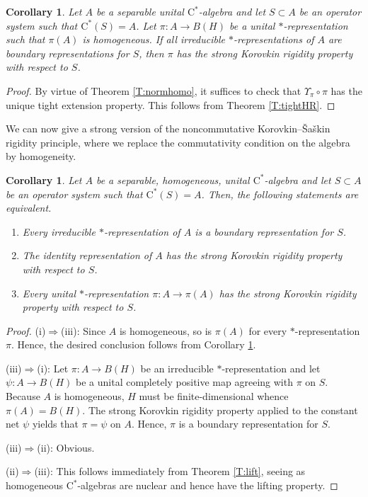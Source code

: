 \documentclass[10pt]{amsart}
\newcommand{\rC}{\mathrm{C}}
\newtheorem{corollary}[lemma]{Corollary}
\theoremstyle{definition}
\begin{document}
\begin{corollary}\label{C:homogrange}
Let $A$ be a separable unital  $\rC^*$-algebra and let $S\subset A$ be an operator system such that $\rC^*(S)=A$. Let $\pi:A\to B(H)$ be a unital $*$-representation such that $\pi(A)$ is homogeneous. If all irreducible $*$-representations of $A$ are boundary representations for $S$, then $\pi$ has the strong Korovkin rigidity property with respect to $S$.
\end{corollary}
\begin{proof}
By virtue of Theorem \ref{T:normhomo}, it suffices to check that $\Upsilon_\pi\circ \pi$ has the unique tight extension property. This follows from Theorem \ref{T:tightHR}.
\end{proof}



We can now give a strong version of the noncommutative Korovkin--\v Sa\v skin rigidity principle, where we replace the commutativity condition on the algebra by homogeneity.



\begin{corollary}\label{C:KShomo}
Let $A$ be a separable, homogeneous, unital $\rC^*$-algebra and let $S\subset A$ be an operator system such that $\rC^*(S)=A$. Then, the following statements are equivalent.
\begin{enumerate}[{\rm (i)}]
\item Every irreducible $*$-representation of $A$ is a boundary representation for $S$.
\item The identity representation of $A$ has the strong Korovkin rigidity property with respect to $S$.
\item Every unital $*$-representation $\pi:A\to\pi(A)$ has the strong Korovkin rigidity property with respect to $S$.
\end{enumerate}
\end{corollary}
\begin{proof}
{\rm (i)}$\Rightarrow${\rm (iii)}: Since $A$ is homogeneous, so is $\pi(A)$ for every $*$-representation $\pi$. Hence, the desired conclusion follows from Corollary \ref{C:homogrange}.

{\rm (iii)}$\Rightarrow${\rm (i)}: Let $\pi:A\to B(H)$ be an irreducible $*$-representation and let $\psi:A\to B(H)$ be a unital completely positive map agreeing with $\pi$ on $S$. Because $A$ is homogeneous, $H$ must be finite-dimensional whence  $\pi(A)=B(H)$. The strong Korovkin rigidity property applied to the constant net $\psi$ yields that $\pi=\psi$ on $A$. Hence, $\pi$ is a boundary representation for $S$.


{\rm (iii)}$\Rightarrow${\rm (ii)}: Obvious.



{\rm (ii)}$\Rightarrow${\rm (iii)}: This follows immediately from Theorem \ref{T:lift}, seeing as homogeneous $\rC^*$-algebras are nuclear \cite[Proposition 2.7.7]{brown2008textrm} and hence have the lifting property.
\end{proof}
\end{document}
